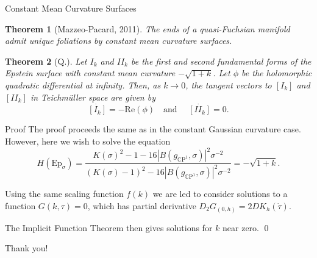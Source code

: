 \documentclass[professionalfont]{beamer}
\newcommand{\CP}{\mathbb{C}\mathrm{P}}
\newtheorem*{thm*}{Theorem}
\newcommand{\two}{I\!I}
\begin{document}
\begin{frame}{Constant Mean Curvature Surfaces}

\begin{thm*}[Mazzeo-Pacard, 2011]
The ends of a quasi-Fuchsian manifold admit unique foliations by constant mean curvature surfaces. 
\end{thm*}
\vspace{0.5cm}

\begin{thm*}[Q.]
Let $I_k$ and $\two_k$ be the first and second fundamental forms of the Epstein surface with constant mean curvature $-\sqrt{1+k}$.
Let $\phi$ be the holomorphic quadratic differential at infinity. 
Then, as $k \to 0$, the tangent vectors to $[I_k]$ and $[\two_k]$ in Teichm\"uller space are given by 
\[
  \dot{[I_k]}= - \mathrm{Re}(\phi) \quad \text{and } \quad \dot{[\two_k]} = 0.
\]
\end{thm*}

\end{frame}




\begin{frame}{Proof}
The proof proceeds the same as in the constant Gaussian curvature case. However, here we wish to solve the equation 
\[
H(\mathrm{Ep}_\sigma)
= \frac{K(\sigma)^2 - 1 - 16|B(g_{\CP^1},\sigma)|^2\sigma^{-2}}{(K(\sigma) - 1)^2 - 16|B(g_{\CP^1},\sigma)|^2\sigma^{-2}} = -\sqrt{1 + k}.
\]\pause

Using the same scaling function $f(k)$ we are led to consider solutions to a function $G(k,\tau) = 0$, which has partial derivative $D_2G_{(0,h)} = 2D K_h(\dot{\tau})$. 
\newline \pause


The Implicit Function Theorem then gives solutions for $k$ near zero. \qed

\end{frame}








\begin{frame}
\begin{center}
Thank you!
\end{center}
\end{frame}
\end{document}
